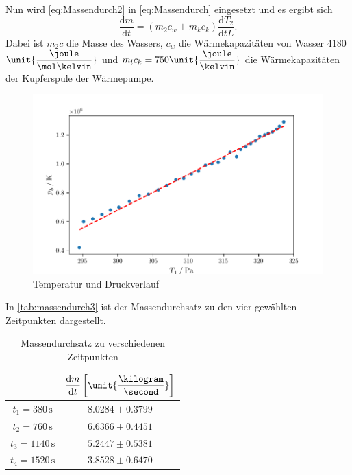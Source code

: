 Nun wird \eqref{eq:Massendurch2} in \eqref{eq:Massendurch} eingesetzt und es ergibt sich
\begin{equation}
  \dfrac{\text{d}m}{\text{d}t} = (m_2c_w +m_kc_k)\dfrac{\text{d}T_2}{\text{d}tL}.
\end{equation}
Dabei ist $m_2c$ die Masse des Wassers, $c_w$ die Wärmekapazitäten von Wasser 4180 $\unit{\dfrac{\joule}{\mol\kelvin}}$ und $m_l c_k = 750 \unit{\dfrac{\joule}{\kelvin}}$ die Wärmekapazitäten der Kupferspule der Wärmepumpe.

\begin{figure}[H]
  \centering
  \includegraphics{Test.pdf}
  \caption{Temperatur und Druckverlauf}
  \label{fig:plot3}
\end{figure}



In \autoref{tab:massendurch3} ist der Massendurchsatz zu den vier gewählten Zeitpunkten dargestellt.
\begin{table}[H]
  \label{tab:massendurch3}
  \centering
  \begin{tabular}{S S}
    \toprule
    & {$\dfrac{\text{d}m}{\text{d}t}  \left[\unit{\dfrac{\kilogram}{\second}}\right]$}  \\
    \midrule
    {$t_1 = 380  \, \unit{\second}$} & {$8.0284 \pm 0.3799$}  \\
    {$t_2 = 760  \, \unit{\second}$} & {$6.6366 \pm 0.4451$}  \\
    {$t_3 = 1140 \, \unit{\second}$} & {$5.2447 \pm 0.5381$}  \\
    {$t_4 = 1520 \, \unit{\second}$} & {$3.8528 \pm 0.6470$}  \\
    \bottomrule
  \end{tabular}
  \caption{Massendurchsatz zu verschiedenen Zeitpunkten}
\end{table}

